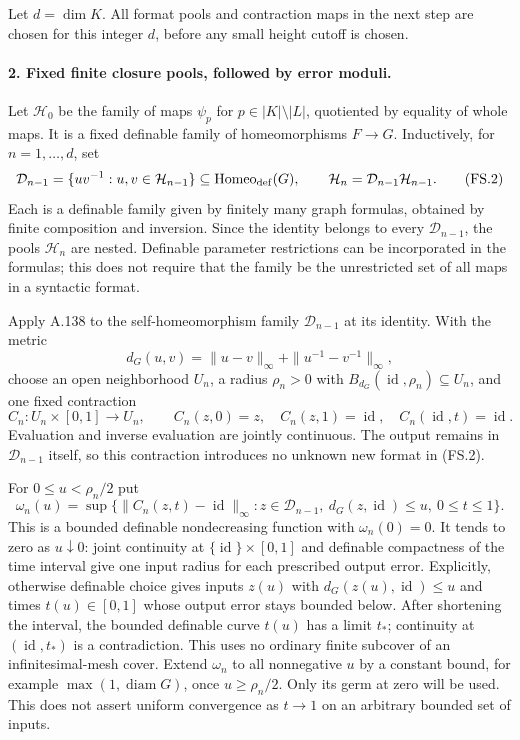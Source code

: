 Let $d=\dim K$. All format pools and contraction maps in the next step
are chosen for this integer $d$, before any small height cutoff is chosen.

\paragraph{2. Fixed finite closure pools, followed by error moduli.}
Let $\mathcal H_0$ be the family of maps $\psi_p$ for $p\in|K|\setminus|L|$,
quotiented by equality of whole maps. It is a fixed definable family of
homeomorphisms $F\to G$. Inductively, for $n=1,\ldots,d$, set
\[
 \mathcal D_{n-1}
   =\{uv^{-1}:u,v\in\mathcal H_{n-1}\}\subseteq\operatorname{Homeo}_{\rm def}(G),
 \qquad
 \mathcal H_n=\mathcal D_{n-1}\mathcal H_{n-1}.
 \tag{FS.2}
\]
Each is a definable family given by finitely many graph formulas, obtained
by finite composition and inversion. Since the identity belongs to every
$\mathcal D_{n-1}$, the pools $\mathcal H_n$ are nested. Definable parameter
restrictions can be incorporated in the formulas; this does not require
that the family be the unrestricted set of all maps in a syntactic format.

Apply A.138 to the self-homeomorphism family $\mathcal D_{n-1}$ at its
identity. With the metric
\[
 d_G(u,v)=\|u-v\|_\infty+\|u^{-1}-v^{-1}\|_\infty,
\]
choose an open neighborhood $U_n$, a radius $\rho_n>0$ with
$B_{d_G}(\operatorname{id},\rho_n)\subseteq U_n$, and one fixed contraction
\[
 C_n:U_n\times[0,1]\to U_n,\qquad
 C_n(z,0)=z,\quad C_n(z,1)=\operatorname{id},\quad
 C_n(\operatorname{id},t)=\operatorname{id}.
 \tag{FS.3}
\]
Evaluation and inverse evaluation are jointly continuous. The output
remains in $\mathcal D_{n-1}$ itself, so this contraction introduces no
unknown new format in (FS.2).

For $0\le u<\rho_n/2$ put
\[
 \omega_n(u)=\sup\{\|C_n(z,t)-\operatorname{id}\|_\infty:
 z\in\mathcal D_{n-1},\ d_G(z,\operatorname{id})\le u,\ 0\le t\le1\}.
 \tag{FS.4}
\]
This is a bounded definable nondecreasing function with $\omega_n(0)=0$.
It tends to zero as $u\downarrow0$: joint continuity at
$\{\operatorname{id}\}\times[0,1]$ and definable compactness of the time
interval give one input radius for each prescribed output error.
Explicitly, otherwise definable choice gives inputs $z(u)$ with
$d_G(z(u),\operatorname{id})\le u$ and times $t(u)\in[0,1]$ whose output
error stays bounded below. After shortening the interval, the bounded
definable curve $t(u)$ has a limit $t_*$; continuity at
$(\operatorname{id},t_*)$ is a contradiction. This uses no ordinary
finite subcover of an infinitesimal-mesh cover.
Extend $\omega_n$ to all nonnegative $u$ by a constant bound, for example
$\max(1,\operatorname{diam}G)$, once $u\ge\rho_n/2$. Only its germ at zero
will be used. This does not assert uniform convergence as $t\to1$ on an
arbitrary bounded set of inputs.

